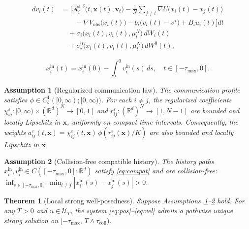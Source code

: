 \documentclass[10pt,a4paper]{amsart}
\newtheorem{assumption}{Assumption}
\newtheorem{theorem}{Theorem}
\newcommand{\R}{\mathbb{R}}
\newcommand{\calU}{\mathcal{U}}
\newcommand{\vstar}{v^{\star}}
\begin{document}
\begin{equation}\label{eq:vel}
\begin{aligned}
  dv_i(t) &= \Biggl[ \mathcal A_i^{\varepsilon,\delta}\bigl(t,\mathbf{x}(t),\mathbf{v}_t\bigr)
    - \frac{1}{N}\sum_{j\neq i}\nabla U\bigl(x_i(t)-x_j(t)\bigr) \\
  &\qquad - \nabla V_{\mathrm{obs}}\bigl(x_i(t)\bigr)
    - b_i\bigl(v_i(t)-\vstar\bigr) + B_i u_i(t) \Biggr]dt \\
  &\quad +\sigma_i\bigl(x_i(t),v_i(t),\mu_t^N\bigr)\,dW_i(t) \\
  &\quad +\sigma_i^{0}\bigl(x_i(t),v_i(t),\mu_t^N\bigr)\,dW^0(t),
\end{aligned}
\end{equation}

\begin{equation}\label{eq:compat}
  x_i^{\mathrm{in}}(t) = x_i^{\mathrm{in}}(0) - \int_t^0 v_i^{\mathrm{in}}(s)\,ds,
  \quad t\in[-\tau_{\max},0].
\end{equation}

\begin{assumption}[Regularized communication law]\label{ass:net}
The communication profile satisfies
$\phi\in C_b^1([0,\infty);[0,\infty))$. For each $i\neq j$, the regularized
coefficients $\chi_{ij}^{\varepsilon}:[0,\infty)\times(\R^d)^N\to[0,1]$ and
$r_{ij}^{\varepsilon}:(\R^d)^N\to[1,N-1]$ are bounded and locally Lipschitz
in $\mathbf{x}$, uniformly on compact time intervals. Consequently, the weights
$a_{ij}^{\varepsilon}(t,\mathbf{x}) = \chi_{ij}^{\varepsilon}(t,\mathbf{x})\,
\phi(r_{ij}^{\varepsilon}(\mathbf{x})/K)$ are also bounded and locally Lipschitz
in $\mathbf{x}$.
\end{assumption}

\begin{assumption}[Collision-free compatible history]\label{ass:hist}
The history paths
$x_i^{\mathrm{in}},v_i^{\mathrm{in}} \in C([-\tau_{\max},0];\R^d)$ satisfy
\eqref{eq:compat} and are collision-free:
$\inf_{s\in[-\tau_{\max},0]}\min_{i\neq j}
|x_i^{\mathrm{in}}(s)-x_j^{\mathrm{in}}(s)|>0$.
\end{assumption}

\begin{theorem}[Local strong well-posedness]\label{thm:local}
Suppose Assumptions~\ref{ass:net}--\ref{ass:hist} hold. For any $T>0$ and
$u\in\calU_T$, the system \eqref{eq:pos}--\eqref{eq:vel} admits a pathwise
unique strong solution on $[-\tau_{\max},\,T\wedge\tau_{\mathrm{coll}})$.
\end{theorem}
\end{document}
